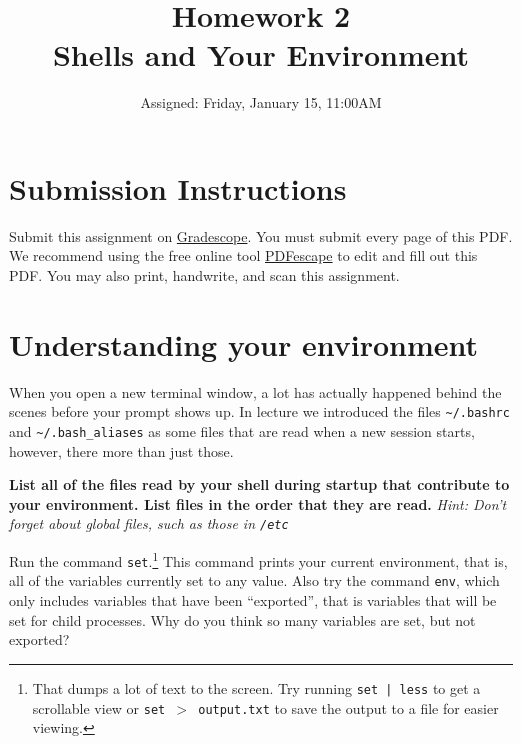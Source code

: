 \documentclass{article}
\begin{document}
\fancyfoot[C]{\thepage~/~\pageref*{LastPage}}
\pagestyle{fancyplain}


\title{\textbf{Homework 2\\Shells and Your Environment}}
\author{Assigned: Friday, January 15, 11:00AM}
\date{\textbf{\color{red}{Due: Friday, January 22, 11:00AM (Hard Deadline)}}}
\maketitle


\section*{Submission Instructions}
Submit this assignment on \href{https://gradescope.com/courses/2248}{Gradescope}.
You must submit every page of this PDF.
We recommend using the free online tool \href{https://www.pdfescape.com}{PDFescape}
to edit and fill out this PDF.
You may also print, handwrite, and scan this assignment.


\section{Understanding your environment}

When you open a new terminal window, a lot has actually happened behind the
scenes before your prompt shows up. In lecture we introduced the files
\texttt{\textasciitilde/.bashrc} and \texttt{\textasciitilde/.bash\_aliases}
as some files that are read when a new session starts, however, there more
than just those.

\textbf{List all of the files read by your shell during startup that
contribute to your environment. List files in the order that they are read.}
\emph{Hint: Don't forget about global files, such as those in \texttt{/etc}}

\vspace{4cm}


\noindent
Run the command \texttt{set}.\footnote{
  That dumps a lot of text to the screen. Try running \texttt{set | less} to
  get a scrollable view or \texttt{set $>$ output.txt} to save the output to a
  file for easier viewing.
}
This command prints your current
environment, that is, all of the variables currently set to any
value.  Also try the command \texttt{env}, which only includes variables
that have been ``exported'', that is variables that will be set for child
processes. Why do you think so many variables are set, but not exported?
\end{document}
